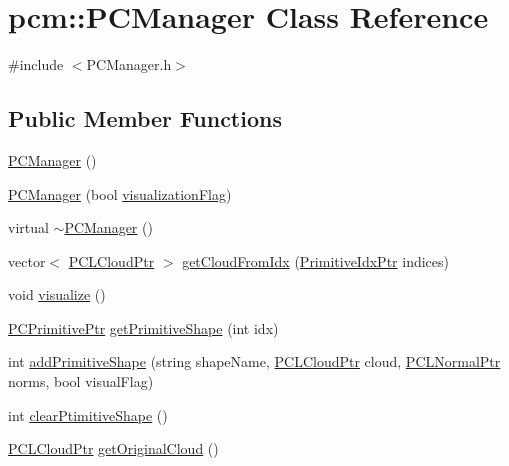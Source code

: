 \hypertarget{classpcm_1_1PCManager}{\section{pcm\-:\-:P\-C\-Manager Class Reference}
\label{classpcm_1_1PCManager}
}


{\ttfamily \#include $<$P\-C\-Manager.\-h$>$}

\subsection*{Public Member Functions}
\begin{DoxyCompactItemize}
\item 
\hyperlink{classpcm_1_1PCManager_ac9edd680fe7b6e9d8a2358ae8641759e}{P\-C\-Manager} ()
\item 
\hyperlink{classpcm_1_1PCManager_af9dabc49537fa4521e7de8323a686856}{P\-C\-Manager} (bool \hyperlink{classpcm_1_1PCManager_af2215813be83c41ca788a40614c9fadb}{visualization\-Flag})
\item 
virtual \hyperlink{classpcm_1_1PCManager_a488397e09fc7593a54d359ca899d6111}{$\sim$\-P\-C\-Manager} ()
\item 
vector$<$ \hyperlink{PCPrimitive_8h_aa14a240c8d999c4f56133c0f70e88783}{P\-C\-L\-Cloud\-Ptr} $>$ \hyperlink{classpcm_1_1PCManager_a73da6d454214f5ba90d978b50ff4438f}{get\-Cloud\-From\-Idx} (\hyperlink{PCPrimitive_8h_a6ec0f6fbb026ae4b66cac121673c3a8a}{Primitive\-Idx\-Ptr} indices)
\item 
void \hyperlink{classpcm_1_1PCManager_ad73afae724cbba84e40ed94ac4123864}{visualize} ()
\item 
\hyperlink{PCManager_8h_a0976ac6881bc2fcf1a5503663203e83f}{P\-C\-Primitive\-Ptr} \hyperlink{classpcm_1_1PCManager_a3575801a21b3fd9613dd57cb97ffaa47}{get\-Primitive\-Shape} (int idx)
\item 
int \hyperlink{classpcm_1_1PCManager_a121d34f52021c5aed1e5133688df8774}{add\-Primitive\-Shape} (string shape\-Name, \hyperlink{PCPrimitive_8h_aa14a240c8d999c4f56133c0f70e88783}{P\-C\-L\-Cloud\-Ptr} cloud, \hyperlink{PCPrimitive_8h_a1bc38ce8b0c26e5f2d28fae9f3e3ea97}{P\-C\-L\-Normal\-Ptr} norms, bool visual\-Flag)
\item 
int \hyperlink{classpcm_1_1PCManager_a993ec5fee41e0ce3b4f9ce403c86aaec}{clear\-Ptimitive\-Shape} ()
\item 
\hyperlink{PCPrimitive_8h_aa14a240c8d999c4f56133c0f70e88783}{P\-C\-L\-Cloud\-Ptr} \hyperlink{classpcm_1_1PCManager_a3f26dafa3a2808b3ee927d9724f9c9a6}{get\-Original\-Cloud} ()

\end{DoxyCompactItemize}
